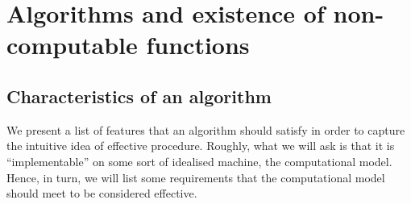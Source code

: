 \chapter{Algorithms and existence of non-computable functions}

\section{Characteristics of an algorithm}
\label{se:alg-char}

We present a list of features that an algorithm should satisfy in
order to capture the intuitive idea of effective procedure. Roughly,
what we will ask is that it is ``implementable'' on some sort of
idealised machine, the computational model. Hence, in turn, we will
list some requirements that the computational model should meet to be
considered effective.

